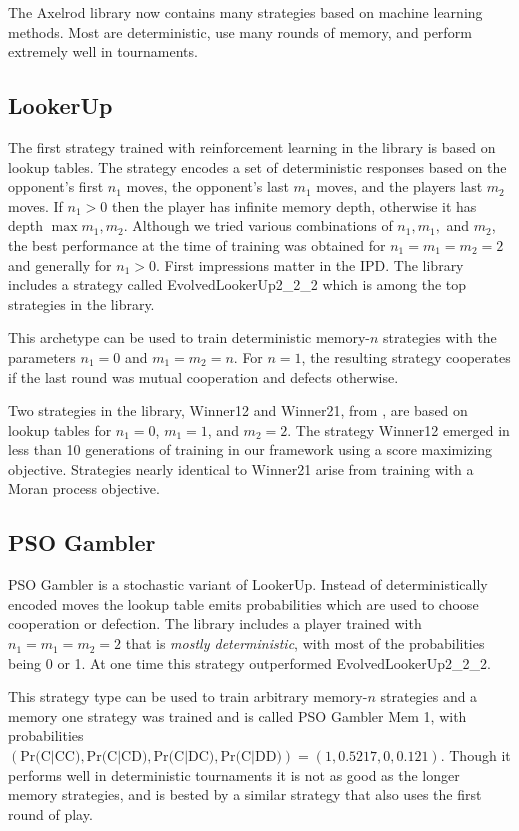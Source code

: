 \documentclass{article}
\begin{document}
The Axelrod library now contains many strategies based on machine learning
methods. Most are deterministic, use many rounds of memory, and perform
extremely well in tournaments.

\subsection{LookerUp}

The first strategy trained with reinforcement learning in the library is based
on lookup tables. The strategy encodes a set of deterministic responses
based on the opponent's first $n_1$ moves, the opponent's last $m_1$ moves, and
the players last $m_2$ moves. If $n_1 > 0$ then the player has infinite memory
depth, otherwise it has depth $\max{m_1, m_2}$. Although we tried various
combinations of $n_1, m_1,$ and $m_2$, the best performance at the time of
training was obtained for $n_1 = m_1 = m_2 = 2$ and generally for $n_1 > 0$. 
First impressions matter in the IPD. The library includes a strategy
called EvolvedLookerUp2\_2\_2 which is among the top strategies in the library.

This archetype can be used to train deterministic memory-$n$ strategies with the
parameters $n_1=0$ and $m_1=m_2=n$. For $n=1$, the resulting strategy cooperates
if the last round was mutual cooperation and defects otherwise.

Two strategies in the library, Winner12 and Winner21, from \cite{Mathieu2015},
are based on lookup tables for $n_1 = 0$, $m_1 = 1$, and $m_2=2$. The strategy
Winner12 emerged in less than 10 generations of training in our framework using
a score maximizing objective. Strategies nearly identical to Winner21 arise
from training with a Moran process objective.

\subsection{PSO Gambler}

PSO Gambler is a stochastic variant of LookerUp. Instead of deterministically
encoded moves the lookup table emits probabilities which are
used to choose cooperation or defection. The library includes a player trained
with $n_1 = m_1 = m_2 = 2$ that is \emph{mostly deterministic}, with most of the
probabilities being 0 or 1. At one time this strategy outperformed
EvolvedLookerUp2\_2\_2.

This strategy type can be used to train arbitrary memory-$n$ strategies and a
memory one strategy was trained and is called PSO Gambler Mem 1, with
probabilities $(\text{Pr(C|CC)}, \text{Pr(C|CD)}, \text{Pr(C|DC)}, \text{Pr(C|DD)}) = (1, 0.5217, 0, 0.121)$. Though it performs well in deterministic tournaments
it is not as good as the longer memory strategies, and is bested by a similar
strategy that also uses the first round of play.
\end{document}
